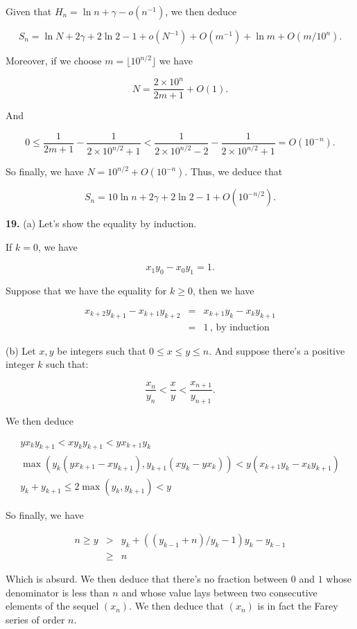 \documentclass[a4paper,12pt]{article}
\newcommand{\newpar}[1]{\bigskip \noindent \textbf{#1.}}
\newcommand{\subpar}[1]{\medskip \noindent (#1)}
\begin{document}
Given that $H_n = \ln n + \gamma - o(n^{-1})$, we then deduce

\[  S_n = \ln N + 2\gamma + 2\ln 2 - 1 + o(N^{-1}) + O(m^{-1}) + \ln m
+ O(m/10^n).\]

Moreover, if we choose $m = \lfloor 10^{n/2}\rfloor$ we have

\[ N = \frac{2\times 10^n}{2m+1} + O(1).\]

And

\[ 0 \le \frac{1}{2m+1} - \frac{1}{2\times10^{n/2}+1} <
\frac{1}{2\times10^{n/2}-2} - \frac{1}{2\times10^{n/2}+1} =
O(10^{-n}).\]

So finally, we have $N = 10^{n/2} + O(10^{-n})$.  Thus, we deduce that

\[ S_n = 10 \ln n + 2\gamma + 2\ln 2 -1 + O(10^{-n/2}).\]

\newpar{19} \subpar{a} Let's show the equality by induction.

If $k=0$, we have

\[ x_1 y_0 - x_0 y_1 = 1.\]

Suppose that we have the equality for $k \ge 0$, then we have

\begin{eqnarray*}
  x_{k+2} y_{k+1} - x_{k+1} y_{k+2} &=& x_{k+1} y_k - x_k y_{k+1} \\
  &=&1\,\mbox{, by induction}
\end{eqnarray*}

\subpar{b}  Let $x, y$ be integers such that $0 \le x \le y \le n$.
And suppose there's a positive integer $k$ such that:

\[ \frac{x_n}{y_n} < \frac{x}{y} < \frac{x_{n+1}}{y_{n+1}}.\]

We then deduce

\begin{eqnarray*}
  y x_k y_{k+1} < x y_k y_{k+1} < y x_{k+1} y_k \\
  \max\left( y_k( y x_{k+1} - x y_{k+1} ), y_{k+1} (x y_k - y x_k)
  \right) < y (x_{k+1} y_k - x_k y_{k+1}) \\ 
  y_k + y_{k+1} \le 2 \max(y_k, y_{k+1}) <  y
\end{eqnarray*}

So finally, we have

\begin{eqnarray*}
  n \ge y &>& y_k + \left((y_{k-1} + n)/y_k - 1 \right) y_k - y_{k-1} \\
  &\ge& n
\end{eqnarray*}

Which is absurd.  We then deduce that there's no fraction between $0$
and $1$ whose denominator is less than $n$ and whose value lays
between two consecutive elements of the sequel $(x_n)$.  We then
deduce that $(x_n)$ is in fact the Farey series of order $n$.
\end{document}
